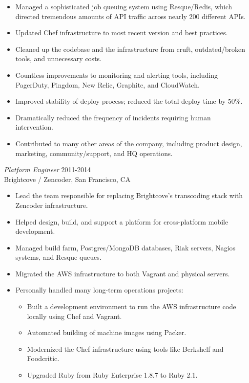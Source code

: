 \documentclass[line,margin]{res}
\begin{document}
\begin{resume}
\begin{itemize}
    \item Managed a sophisticated job queuing system using Resque/Redis, which directed tremendous amounts of API traffic across nearly 200 different APIs.
    \item Updated Chef infrastructure to most recent version and best practices.
    \item Cleaned up the codebase and the infrastructure from cruft, outdated/broken tools, and unnecessary costs.
    \item Countless improvements to monitoring and alerting tools, including PagerDuty, Pingdom, New Relic, Graphite, and CloudWatch.
    \item Improved stability of deploy process; reduced the total deploy time by 50\%.
    \item Dramatically reduced the frequency of incidents requiring human intervention.
    \item Contributed to many other areas of the company, including product design, marketing, community/support, and HQ operations.
  \end{itemize}

  {\sl Platform Engineer}  \hfill 2011-2014 \\
  Brightcove / Zencoder,
  San Francisco, CA
  \begin{itemize}  \itemsep -2pt %
    \item Lead the team responsible for replacing Brightcove's transcoding stack with Zencoder infrastructure.
    \item Helped design, build, and support a platform for cross-platform mobile development.
    \item Managed build farm, Postgres/MongoDB databases, Riak servers, Nagios systems, and Resque queues.
    \item Migrated the AWS infrastructure to both Vagrant and physical servers.
    \item Personally handled many long-term operations projects:

    \vspace{-2.5mm} %
    \begin{itemize}  \itemsep -3pt %
      \item Built a development environment to run the AWS infrastructure code locally using Chef and Vagrant.
      \item Automated building of machine images using Packer.
      \item Modernized the Chef infrastructure using tools like Berkshelf and Foodcritic.
      \item Upgraded Ruby from Ruby Enterprise 1.8.7 to Ruby 2.1.
    \end{itemize}
  \end{itemize}


\end{resume}
\end{document}

